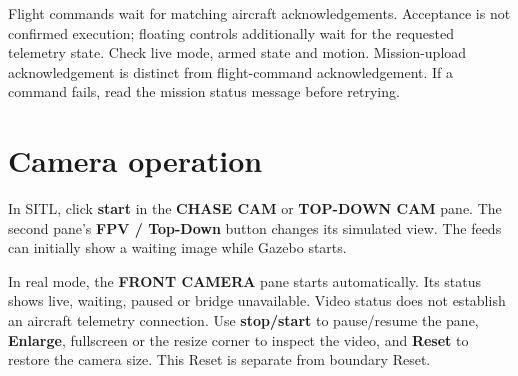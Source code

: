 \documentclass[11pt]{article}
\begin{document}
Flight commands wait for matching aircraft acknowledgements. Acceptance is not
confirmed execution; floating controls additionally wait for the requested telemetry state. Check live mode, armed state and motion. Mission-upload acknowledgement
is distinct from flight-command acknowledgement. If a command fails, read the
mission status message before retrying.

\section{Camera operation}
In SITL, click \textbf{start} in the \textbf{CHASE CAM} or \textbf{TOP-DOWN CAM}
pane. The second pane's \textbf{FPV / Top-Down} button changes its simulated view.
The feeds can initially show a waiting image while Gazebo starts.

In real mode, the \textbf{FRONT CAMERA} pane starts automatically. Its status shows
live, waiting, paused or bridge unavailable. Video status does not establish an
aircraft telemetry connection. Use \textbf{stop/start} to pause/resume the pane,
\textbf{Enlarge}, fullscreen or the resize corner to inspect the video, and
\textbf{Reset} to restore the camera size. This Reset is separate from boundary Reset.
\end{document}
